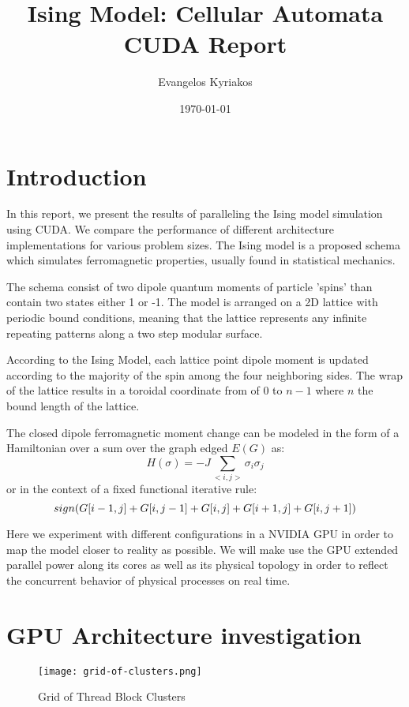\documentclass[twocolumn]{article}
\title{Ising Model: Cellular Automata CUDA Report}
\author{Evangelos Kyriakos}
\date{\today}
\begin{document}
\maketitle

\section{Introduction}
In this report, we present the results of paralleling the Ising model simulation using CUDA. We compare the performance of different architecture implementations for various problem sizes. The Ising model is a proposed schema which simulates ferromagnetic properties, usually found in statistical mechanics.

The schema consist of two dipole quantum moments of particle 'spins' than contain two states either 1 or -1. The model is arranged on a 2D lattice with periodic bound conditions, meaning that the lattice represents any infinite repeating patterns along a two step modular surface.

According to the Ising Model, each lattice point dipole moment is updated according to the majority of the spin among the four neighboring sides. The wrap of the lattice results in a toroidal coordinate from of 0 to $n - 1$ where $n$ the bound length of the lattice.

The closed dipole ferromagnetic moment change can be modeled in the form of a Hamiltonian over a sum over the graph edged $E(G)$ as:
\[
	H(\sigma) = -J \sum_{<i,j>} \sigma_i \sigma_j
\]
or in the context of a fixed functional iterative rule:
\[
sign(G[i-1,j] + G[i,j-1] + \\ G[i,j] + G[i+1,j] + G[i,j+1])
\]

Here we experiment with different configurations in a NVIDIA GPU in order to map the model closer to reality as possible. We will make use the GPU extended parallel power along its cores as well as its physical topology in order to reflect the concurrent behavior of physical processes on real time.

\section{GPU Architecture investigation}

\begin{figure}[htbp]
    \centering
    \texttt{[image: grid-of-clusters.png]}
    \caption{Grid of Thread Block Clusters}
    \label{fig:grid-of-clusters}
\end{figure}
\end{document}
